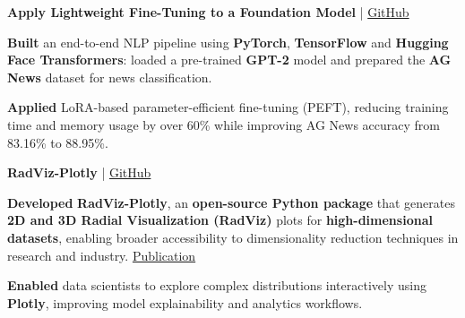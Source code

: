 \begin{onecolentry}
\textbf{Apply Lightweight Fine-Tuning to a Foundation Model} | \href{https://github.com/elewah/Apply-Lightweight-Fine-Tuning-to-a-Foundation-Model}{GitHub}
\begin{highlights}

\item \textbf{Built} an end-to-end NLP pipeline using \textbf{PyTorch}, \textbf{TensorFlow} and \textbf{Hugging Face Transformers}: loaded a pre-trained \textbf{GPT-2} model and prepared the \textbf{AG News} dataset for news classification.

\item \textbf{Applied} LoRA-based parameter-efficient fine-tuning (PEFT), reducing training time and memory usage by over 60\% while improving AG News accuracy from 83.16\% to 88.95\%.


\end{highlights}
\end{onecolentry}


\begin{onecolentry}
    \textbf{RadViz-Plotly} | \href{https://github.com/elewah/RadViz-Plotly}{GitHub}
    \begin{highlights}
        \item \textbf{Developed} \textbf{RadViz-Plotly}, an \textbf{open-source Python package} that generates \textbf{2D and 3D Radial Visualization (RadViz)} plots for \textbf{high-dimensional datasets}, enabling broader accessibility to dimensionality reduction techniques in research and industry. \href{https://ieeexplore.ieee.org/document/9504983}{Publication}
        
        \item \textbf{Enabled} data scientists to explore complex distributions interactively using \textbf{Plotly}, improving model explainability and analytics workflows.
    \end{highlights}
\end{onecolentry}




